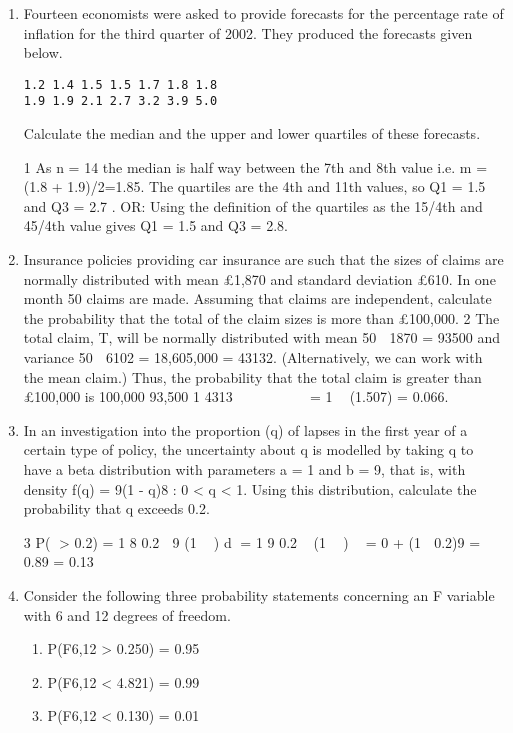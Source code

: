 \documentclass[a4paper,12pt]{article}
\begin{document}
\begin{enumerate}
\item  Fourteen economists were asked to provide forecasts for the percentage rate
of inflation for the third quarter of 2002. They produced the forecasts given
below.
\begin{verbatim}
1.2 1.4 1.5 1.5 1.7 1.8 1.8
1.9 1.9 2.1 2.7 3.2 3.9 5.0    
\end{verbatim}

Calculate the median and the upper and lower quartiles of these forecasts. 

1 As n = 14 the median is half way between the 7th and 8th value
i.e. m = (1.8 + 1.9)/2=1.85.
The quartiles are the 4th and 11th values, so Q1 = 1.5 and Q3 = 2.7 .
OR: Using the definition of the quartiles as the 15/4th and 45/4th value gives
Q1 = 1.5 and Q3 = 2.8.
\newpage
\item Insurance policies providing car insurance are such that the sizes of claims are
normally distributed with mean £1,870 and standard deviation £610. In one
month 50 claims are made. Assuming that claims are independent, calculate
the probability that the total of the claim sizes is more than £100,000. 
2 The total claim, T, will be normally distributed with mean 50  1870 = 93500
and variance 50  6102 = 18,605,000 = 43132.
(Alternatively, we can work with the mean claim.)
Thus, the probability that the total claim is greater than £100,000 is
100,000 93,500
1
4313
  
  
 
= 1  (1.507) = 0.066.
\newpage
\item  In an investigation into the proportion (q) of lapses in the first year of a
certain type of policy, the uncertainty about q is modelled by taking q to have a
beta distribution with parameters a = 1 and b = 9, that is, with density
f(q) = 9(1 - q)8 : 0 < q < 1.
Using this distribution, calculate the probability that q exceeds 0.2. 


3 P( > 0.2) =
1
8
0.2
 9 (1  ) d
=
1
9
0.2
(1  ) 
= 0 + (1  0.2)9 = 0.89 = 0.13
\newpage
\item Consider the following three probability statements concerning an F variable
with 6 and 12 degrees of freedom.
\begin{enumerate}
\item P(F6,12 > 0.250) = 0.95
\item P(F6,12 < 4.821) = 0.99
\item P(F6,12 < 0.130) = 0.01
\end{enumerate}


\end{enumerate}
\end{document}
